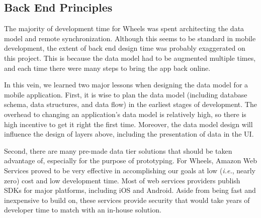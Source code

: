 \documentclass[12pt, a4paper]{article}
\begin{document}
\begin{multicols*}{2}
\subsection{Back End Principles}
The majority of development time for Wheels was spent architecting the data model and remote synchronization. Although this seems to be standard in mobile development, the extent of back end design time was probably exaggerated on this project. This is because the data model had to be augmented multiple times, and each time there were many steps to bring the app back online.

In this vein, we learned two major lessons when designing the data model for a mobile application. First, it is wise to plan the data model (including database schema, data structures, and data flow) in the earliest stages of development. The overhead to changing an application's data model is relatively high, so there is high incentive to get it right the first time. Moreover, the data model design will influence the design of layers above, including the presentation of data in the UI.

Second, there are many pre-made data tier solutions that should be taken advantage of, especially for the purpose of prototyping. For Wheels, Amazon Web Services proved to be very effective in accomplishing our goals at low (\textit{i.e.}, nearly zero) cost and low development time. Most of web services providers publish SDKs for major platforms, including iOS and Android. Aside from being fast and inexpensive to build on, these services provide security that would take years of developer time to match with an in-house solution.


\end{multicols*}
\end{document}
